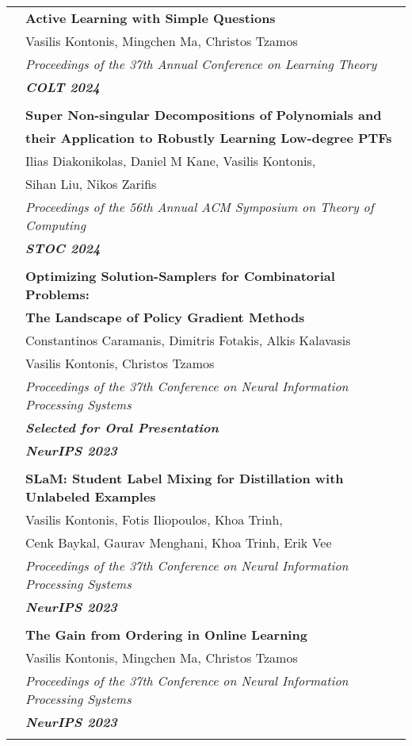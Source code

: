\documentclass[letterpaper,11pt,oneside]{article}
\begin{document}
\begin{longtable}{@{} l l}
 &\textbf{Active Learning with Simple Questions} \\
 & Vasilis Kontonis, Mingchen Ma, Christos Tzamos \\
 & \emph{Proceedings of the 37th Annual Conference on Learning Theory} \\
 & \emph{\textbf{COLT 2024}} \\
 & \\

 &\textbf{Super Non-singular Decompositions of Polynomials and}\\
 &\textbf{their Application to Robustly Learning Low-degree PTFs} \\
 & Ilias Diakonikolas, Daniel M Kane, Vasilis Kontonis, \\
 & Sihan Liu, Nikos Zarifis\\
 & \emph{Proceedings of the 56th Annual ACM Symposium on Theory of Computing}\\
 & \emph{\textbf{STOC 2024}} \\
 & \\

 &\textbf{Optimizing Solution-Samplers for Combinatorial Problems:}\\
 &\textbf{The Landscape of Policy Gradient Methods}\\
 & Constantinos Caramanis, Dimitris Fotakis, Alkis Kalavasis\\
 & Vasilis Kontonis, Christos Tzamos\\
 & \emph{Proceedings of the 37th Conference on Neural Information Processing Systems} \\
 & \emph{\textbf{Selected for Oral Presentation}} \\
 & \emph{\textbf{NeurIPS 2023}} \\
 & \\

 &\textbf{SLaM: Student Label Mixing for Distillation with Unlabeled Examples}\\
 & Vasilis Kontonis, Fotis Iliopoulos,  Khoa Trinh,\\
 & Cenk Baykal, Gaurav Menghani, Khoa Trinh, Erik Vee\\ 
 & \emph{Proceedings of the 37th Conference on Neural Information Processing Systems} \\
 & \emph{\textbf{NeurIPS 2023}} \\
 & \\

 &\textbf{The Gain from Ordering in Online Learning}\\
 & Vasilis Kontonis, Mingchen Ma, Christos Tzamos\\
 & \emph{Proceedings of the 37th Conference on Neural Information Processing Systems} \\
 & \emph{\textbf{NeurIPS 2023}} \\
 & \\


\end{longtable}
\end{document}
